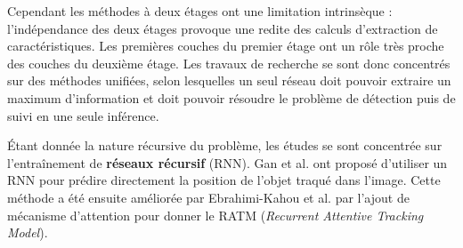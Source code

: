 \documentclass[10pt,twocolumn,letterpaper,french]{article}
\begin{document}
Cependant les méthodes à deux étages ont une limitation intrinsèque : l'indépendance des deux étages provoque une redite des calculs d'extraction de caractéristiques. Les premières couches du premier étage ont un rôle très proche des couches du deuxième étage. Les travaux de recherche se sont donc concentrés sur des méthodes unifiées, selon lesquelles un seul réseau doit pouvoir extraire un maximum d'information et doit pouvoir résoudre le problème de détection puis de suivi en une seule inférence.

Étant donnée la nature récursive du problème, les études se sont concentrée sur l’entraînement de \textbf{réseaux récursif} (RNN). Gan et al. \cite{RNNtracking} ont proposé d'utiliser un RNN pour prédire directement la position de l'objet traqué dans l'image. Cette méthode a été ensuite améliorée par Ebrahimi-Kahou et al. \cite{RATM} par l'ajout de mécanisme d'attention pour donner le RATM (\textit{Recurrent Attentive Tracking Model}). \\
  
\end{document}
